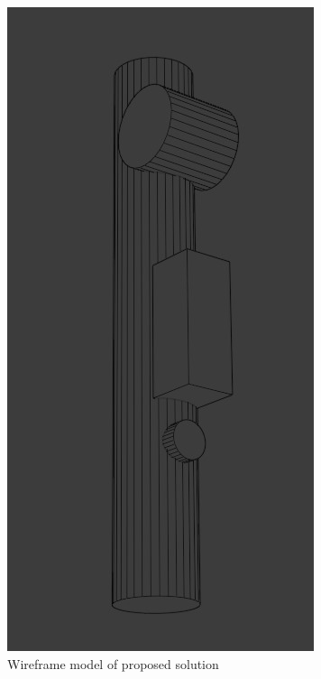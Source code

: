 \begin{figure}[h]
	\centering
	\includegraphics*[scale=0.8]{wireframe.jpg}
	\caption{Wireframe model of proposed solution}
	
	\end{figure}

